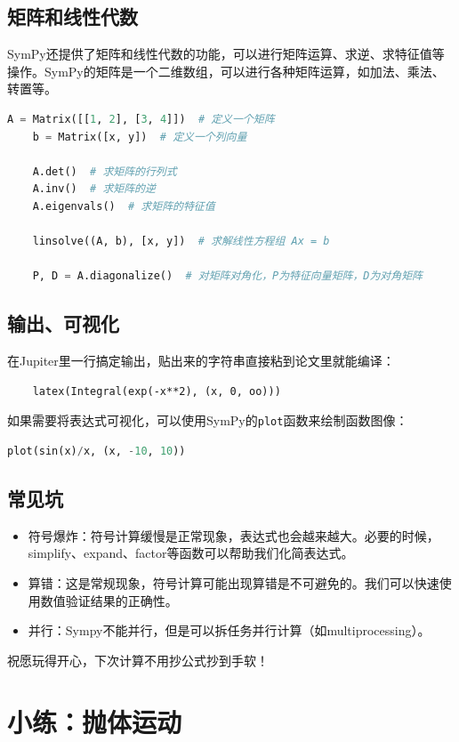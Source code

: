 \documentclass[../main.tex]{subfiles}
\begin{document}
\subsection{矩阵和线性代数}
SymPy还提供了矩阵和线性代数的功能，可以进行矩阵运算、求逆、求特征值等操作。SymPy的矩阵是一个二维数组，可以进行各种矩阵运算，如加法、乘法、转置等。
\begin{lstlisting}[language=python]
    A = Matrix([[1, 2], [3, 4]])  # 定义一个矩阵
    b = Matrix([x, y])  # 定义一个列向量

    A.det()  # 求矩阵的行列式
    A.inv()  # 求矩阵的逆
    A.eigenvals()  # 求矩阵的特征值

    linsolve((A, b), [x, y])  # 求解线性方程组 Ax = b

    P, D = A.diagonalize()  # 对矩阵对角化，P为特征向量矩阵，D为对角矩阵
\end{lstlisting}

\subsection{输出、可视化}
在Jupiter里一行搞定输出，贴出来的字符串直接粘到论文里就能编译：
\begin{lstlisting}
    latex(Integral(exp(-x**2), (x, 0, oo)))
\end{lstlisting}

如果需要将表达式可视化，可以使用SymPy的\texttt{plot}函数来绘制函数图像：
\begin{lstlisting}[language=python]
    plot(sin(x)/x, (x, -10, 10))
\end{lstlisting}

\subsection{常见坑}
\begin{itemize}
    \item 符号爆炸：符号计算缓慢是正常现象，表达式也会越来越大。必要的时候，simplify、expand、factor等函数可以帮助我们化简表达式。
    \item 算错：这是常规现象，符号计算可能出现算错是不可避免的。我们可以快速使用数值验证结果的正确性。
    \item 并行：Sympy不能并行，但是可以拆任务并行计算（如multiprocessing）。
\end{itemize}

祝愿玩得开心，下次计算不用抄公式抄到手软！

\section{小练：抛体运动}
\end{document}
